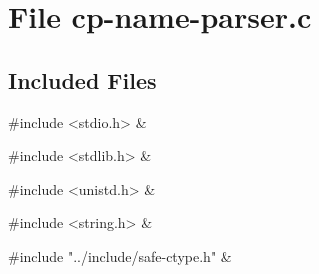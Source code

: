 

\section{File cp-name-parser.c}
\label{file_cp-name-parser.c}


\subsection*{Included Files}

\begin{cxreftabi}
{\stt \#include <stdio.h>} &\\
\end{cxreftabi}

\medskip
\begin{cxreftabi}
{\stt \#include <stdlib.h>} &\\
\end{cxreftabi}

\medskip
\begin{cxreftabi}
{\stt \#include <unistd.h>} &\\
\end{cxreftabi}

\medskip
\begin{cxreftabi}
{\stt \#include <string.h>} &\\
\end{cxreftabi}

\medskip
\begin{cxreftabi}
{\stt \#include "../include/safe-ctype.h"} &\\
\end{cxreftabi}

